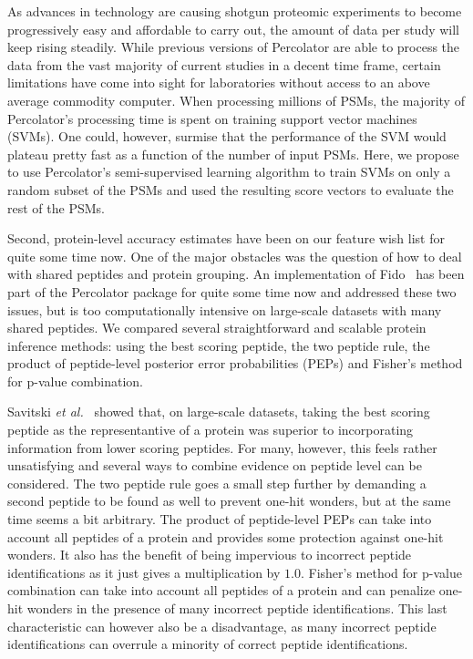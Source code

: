 \documentclass{article}
\begin{document}
As advances in technology are causing shotgun proteomic experiments to
become progressively easy and affordable to carry out, the amount of
data per study will keep rising steadily. While previous versions of
Percolator are able to process the data from the vast majority of
current studies in a decent time frame, certain limitations have come
into sight for laboratories without access to an above average
commodity computer. When processing millions of PSMs, the majority of
Percolator’s processing time is spent on training support vector
machines (SVMs). One could, however, surmise that the performance of
the SVM would plateau pretty fast as a function of the number of input
PSMs. Here, we propose to use Percolator’s semi-supervised learning
algorithm to train SVMs on only a random subset of the PSMs and used
the resulting score vectors to evaluate the rest of the PSMs.

Second, protein-level accuracy estimates have been on our feature wish
list for quite some time now. One of the major obstacles was the
question of how to deal with shared peptides and protein grouping. An
implementation of Fido~\cite{serang2010efficient} has been part of the
Percolator package for quite some time now and addressed these two
issues, but is too computationally intensive on large-scale
datasets with many shared peptides. We compared several
straightforward and scalable protein inference methods: using the
best scoring peptide, the two peptide rule, the product of
peptide-level posterior error probabilities (PEPs) and Fisher’s method
for p-value combination.

Savitski {\em et al.}~\cite{savitski2015scalable} showed that, on
large-scale datasets, taking the best scoring peptide as the
representantive of a protein was superior to incorporating information
from lower scoring peptides. For many, however, this feels rather
unsatisfying and several ways to combine evidence on peptide level can
be considered. The two peptide rule goes a small step further by
demanding a second peptide to be found as well to prevent one-hit
wonders, but at the same time seems a bit arbitrary. The product of
peptide-level PEPs can take into account all peptides of a protein and
provides some protection against one-hit wonders. It also has the
benefit of being impervious to incorrect peptide identifications as it
just gives a multiplication by $1.0$. Fisher's method for p-value
combination can take into account all peptides of a protein and can
penalize one-hit wonders in the presence of many incorrect peptide
identifications. This last characteristic can however also be a
disadvantage, as many incorrect peptide identifications can overrule a
minority of correct peptide identifications.
\end{document}
